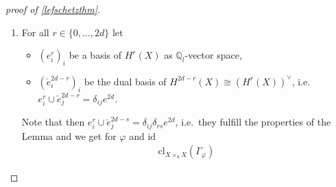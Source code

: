 \documentclass[english]{scrartcl}
\theoremstyle{definition}
\newtheorem{Lem}[Def]{Lemma}
\theoremstyle{remark}
\newcommand*{\Z}{\mathds{Z}}
\newcommand*{\Q}{\mathds{Q}}
\newcommand*{\Zl}{\Z_l} %
\newcommand*{\Ql}{\Q_l} %
\newcommand*{\End}[1]{\text{End}(#1)} %
\newcommand*{\id}{\text{id}} %
\newcommand*{\idest}{i.e.\ }
\newcommand*{\tr}[1]{\text{tr}\left(#1\right)} %
\newcommand*{\Graph}[1]{{\Gamma_{#1}}} %
\newcommand*{\cl}[2]{{\text{cl}_{#1}\left(#2\right)}} %
\newcommand*{\one}[1]{{1_{#1}}}%
\let\altphi\phi
\renewcommand*{\phi}{\varphi}
\begin{document}
\begin{proof}[proof of \autoref{lefschetzthm}]
\begin{enumerate}[label={Step \arabic*.}]
\begin{Lem}
      and $\altphi\in\End(X)$ regular.
      Write $e^{2d}\in H^{2d}(X)$ for the canonical generator
      with $\tr{e^{2d}}=1\in\Ql$.
      Furthermore, let $(b_k)_k$ be a basis of $H^*(X)$ as
      $\Ql$-vector space and $(f_k)_k$ be the dual Basis with respect
      to the cup product, \idest $b_k\cup f_l=\delta_{kl}e^{2d}$.
      Then
      \begin{gather*}
        \cl{X\times_k X}{\Graph{\phi}} =
        \sum_{k}^{2d} \phi^*(b_k)\otimes  f_k
      \end{gather*}
      \begin{proof}
        By the  %
        $H^*(X\otimes X) \cong H^*(X)\otimes_{\Ql}H^*(X)$ is a
        $H^*(X)$-module with basis
        $(\one{X}\otimes f_k)_{k}$.
        Therefore, there are unique factors $a_{k}$ in $H^*(X)$ s.t.
        \begin{gather}
          \label{eq:step2}
          \cl{X\times_k Y}{\Graph{\phi}} =
          \sum_{k} a_k\otimes f_k
        \end{gather}
        Explicitly
        \begin{align*}
          a_j
          = p_*(a_j\otimes e^{2d})
          &= p_*\Big(
            \sum_k(a_k\otimes f_k)\cup (\one{X}\otimes b_j)
            \Big)\\
          &\overset{\mathllap{\eqref{eq:step2}}}= p_*\left(
            \cl{X\times_k X}{\Graph{\phi}} \cup q^*(b_j)
            \right)\\
          &\overset{\mathllap{\ref{step1}}}= \phi^*(b_j) 
        \end{align*}
      \end{proof}
    \end{Lem}
  \item
    For all $r\in\{0,\dotsc,2d\}$ let
    \begin{itemize}
    \item $(e_i^r)_{i}$ be a basis of $H^r(X)$ as $\Ql$-vector space,
    \item $(\check e_i^{2d-r})_{i}$ be the dual basis of $H^{2d-r}(X)\cong (H^{r}(X))^\vee$,
      \idest $e^r_i\cup \check e_j^{2d-r}= \delta_{ij}e^{2d}$.
    \end{itemize}
    Note that then $e^r_i\cup \check e_j^{2d-s}=\delta_{ij}\delta_{rs}e^{2d}$,
    \idest they fulfill the properties of the Lemma
    and we get for $\phi$ and $\id$
    \begin{align*}
      \cl{X\times_k X}{\Graph{\phi}}

\end{align*}
\end{enumerate}
\end{proof}
\end{document}
